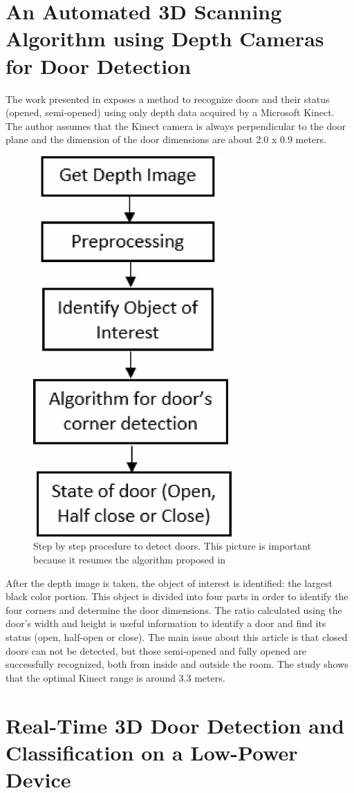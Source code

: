 \newpage

\section{An Automated 3D Scanning Algorithm using Depth
	Cameras for Door Detection \cite{7380814}}

The work presented in \cite{7380814} exposes a method to recognize doors and their status (opened, semi-opened) using only depth data acquired by a Microsoft Kinect. The author assumes that the Kinect camera is always perpendicular to the door plane and the dimension of the door dimensions are about 2.0 x 0.9 meters. 

\begin{figure}[h!]
	\centering
	\includegraphics[width=0.20\linewidth]{images/method_kinect_only_depth.png}
	\caption{Step by step procedure to detect doors. This picture is important because it resumes the algorithm proposed in \cite{7380814}}
\end{figure}

After the depth image is taken, the object of interest is identified: the largest black color portion. This object is divided into four parts in order to identify the four corners and determine the door dimensions. The ratio calculated using the door's width and height is useful information to identify a door and find its status (open, half-open or close). The main issue about this article is that closed doors can not be detected, but those semi-opened and fully opened are successfully recognized, both from inside and outside the room. The study shows that the optimal Kinect range is around 3.3 meters.

\newpage

\section{Real-Time 3D Door Detection and Classification on a Low-Power Device \cite{9096155}}

